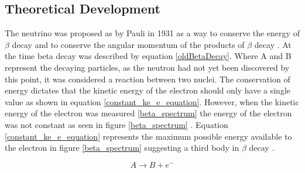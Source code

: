 \documentclass[12pt,a4paper]{article}
\begin{document}
\subsection{Theoretical Development}
The neutrino was proposed as by Pauli in 1931 as a way to conserve the energy of $\beta$ decay and to conserve the angular momentum of the products of $\beta$ decay  \cite{griffiths2008book}\cite{griffiths2008neutrino1.5}\cite{lederman1970resource}. At the time beta decay was described by equation \ref{oldBetaDecay}. Where A and B represent the decaying particles, as the neutron had not yet been discovered by this point, it was considered a reaction between two nuclei. The conservation of energy dictates that the kinetic energy of the electron should only have a single value as shown in equation \ref{constant_ke_e_equation}. However, when the kinetic energy of the electron was measured \ref{beta_spectrum} the energy of the electron was not constant as seen in figure \ref{beta_spectrum} \cite{griffiths2008book} \cite{griffiths2008neutrino1.5} \cite{lewis1970neutrinos}. Equation \ref{constant_ke_e_equation} represents the maximum possible energy available to the electron in figure \ref{beta_spectrum} suggesting a third body in $\beta$ decay \cite{griffiths2008book} \cite{griffiths2008neutrino1.5}.


\begin{equation}
    A \rightarrow B + e^-
    \label{oldBetaDecay}
\end{equation}
\end{document}
